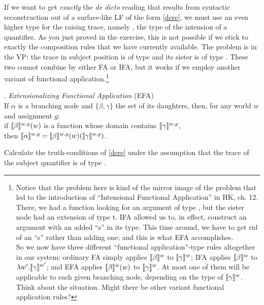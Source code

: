 If we want to get \emph{exactly} the \emph{de dicto} reading that results from syntactic reconstruction out of a surface-like LF of the form \ref{dere}, we must use an even higher type for the raising trace, namely , the type of the intension of a quantifier. As you just proved in the exercise, this is not possible if we stick to exactly the composition rules that we have currently available. The problem is in the VP: the trace in subject position is of type  and its sister is of type . These two connot combine by either FA or IFA, but it works if we employ another variant of functional application.\footnote{Notice that the problem here is kind of the mirror image of the problem that led to the introduction of ``Intensional Functional Application'' in H\amp K, ch. 12. There, we had a function looking for an argument of type , but the sister node had an extension of type t. IFA allowed us to, in effect, construct an argument with an added ``s'' in its type. This time around, we have to get rid of an ``s'' rather than adding one; and this is what EFA accomplishes. \\
\indent So we now have three different ``functional application''-type rules altogether in our system: ordinary FA simply applies $\llbracket \beta \rrbracket^w$ to $\llbracket \gamma \rrbracket^w$; IFA applies $\llbracket \beta \rrbracket^w$ to $\lambda w'.\llbracket \gamma \rrbracket^{w'}$; and EFA applies $\llbracket \beta \rrbracket^w(w)$ to $\llbracket \gamma \rrbracket^w$. At most one of them will be applicable to each given branching node, depending on the type of $\llbracket \gamma \rrbracket^w$.\\
\indent Think about the situation. Might there be other variant functional application rules?}

\ex. \emph{Extensionalizing Functional Application} (EFA)\\
If $\alpha$ is a branching node and $\{\beta,\gamma\}$ the set of its daughters, then, for any world $w$ and assignment $g$: \\
if $\llbracket \beta \rrbracket^{w,g}(w)$ is a function whose domain contains $\llbracket \gamma \rrbracket^{w,g}$,\\
then $\llbracket \alpha \rrbracket^{w,g} = \llbracket \beta \rrbracket^{w,g}(w)(\llbracket \gamma \rrbracket^{w,g})$.

\begin{exercise}
	
	Calculate the truth-conditions of \ref{dere} under the assumption that the trace of the subject quantifier is of type . \eex 
\end{exercise}

